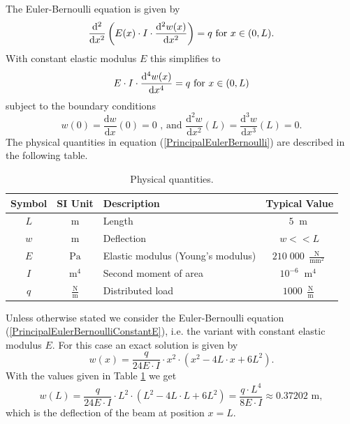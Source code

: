 \documentclass[a4paper,11pt]{article}
\def\Meter{\operatorname{m}}
\def\Pascal{\operatorname{Pa}}
\def\NewtonVsSquareMillimeter{\frac{\operatorname{N}}{\operatorname{mm}^2}}
\def\NewtonVsMeter{\frac{\operatorname{N}}{\operatorname{m}}}
\begin{document}
The Euler-Bernoulli equation is given by
\begin{equation} \label{PrincipalEulerBernoulli}
\frac{\mathrm{d}^2}{\mathrm{d}x^2}\left( E (x) \cdot I \cdot \frac{\mathrm{d}^2 w(x)}{\mathrm{d}x^2} \right) = q \text{ for } x \in (0,L) .\\
\end{equation}
With constant elastic modulus $E$ this simplifies to
\begin{equation} \label{PrincipalEulerBernoulliConstantE}
E\cdot I \cdot \frac{\mathrm{d}^4 w(x)}{\mathrm{d}x^4} = q \text{ for } x \in (0,L)\\
\end{equation}
subject to the boundary conditions
\begin{equation} \label{PrincipalBoundaryConditions}
w( 0) = \frac{\mathrm{d} w}{\mathrm{d}x}(0) = 0 \text{ , and } \frac{\mathrm{d}^2 w}{\mathrm{d}x^2}(L) = \frac{\mathrm{d}^3 w}{\mathrm{d}x^3}(L) = 0.
\end{equation}
The physical quantities in equation (\ref{PrincipalEulerBernoulli}) are described in the following table.

\begin{table}[h!] 
\centering
\begin{tabular}{cclc}
\toprule
\textbf{Symbol} & \textbf{SI Unit} & \textbf{Description}& \textbf{Typical Value}\\
\midrule
$L$ & $\Meter$ & Length & $5\; \Meter$\\
$w$ & $\Meter$ & Deflection &  $w<< L $\\
$E$ & $\Pascal$ & Elastic modulus (Young's modulus) & $210\;000\; \NewtonVsSquareMillimeter$\\
$I$ &$ \Meter^4$ & Second moment of area & $10^{-6}\;\Meter^4$ \\
$q$ &$ \NewtonVsMeter $ & Distributed load & $1000 \;\NewtonVsMeter $ \\
\bottomrule
\end{tabular}
\caption{Physical quantities.}
\label{TableTypicalValues}
\end{table}

Unless otherwise stated we consider the Euler-Bernoulli equation (\ref{PrincipalEulerBernoulliConstantE}), i.e. the variant with constant elastic modulus $E$. For this case an exact solution is given by
\begin{equation*}
w(x) = \frac{q}{24 E\cdot I }\cdot x^2 \cdot \left( x^2 -4L\cdot x + 6L^2\right) .
\end{equation*}
With the values given in Table \ref{TableTypicalValues} we get
\begin{equation} \label{MaximalDeflection}
w( L) = \frac{q}{24 E\cdot I }\cdot L^2 \cdot \left( L^2 -4L\cdot L + 6L^2\right) = \frac{q\cdot L^4}{8 E\cdot I } \approx 0.37202 \text{ m},
\end{equation}
which is the deflection of the beam at position $x = L$.
\end{document}
